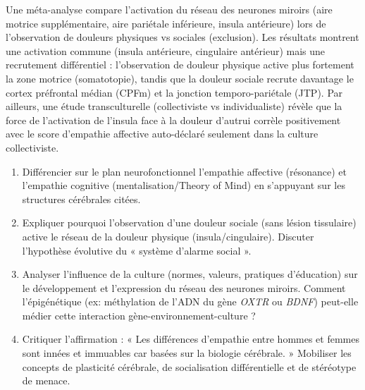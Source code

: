 \documentclass[11pt]{article}
\begin{document}
\begin{exercice}
Une méta-analyse compare l'activation du réseau des neurones miroirs (aire motrice supplémentaire, aire pariétale inférieure, insula antérieure) lors de l'observation de douleurs physiques vs sociales (exclusion). Les résultats montrent une activation commune (insula antérieure, cingulaire antérieur) mais une recrutement différentiel : l'observation de douleur physique active plus fortement la zone motrice (somatotopie), tandis que la douleur sociale recrute davantage le cortex préfrontal médian (CPFm) et la jonction temporo-pariétale (JTP). Par ailleurs, une étude transculturelle (collectiviste vs individualiste) révèle que la force de l'activation de l'insula face à la douleur d'autrui corrèle positivement avec le score d'empathie affective auto-déclaré seulement dans la culture collectiviste.
\begin{enumerate}
    \item Différencier sur le plan neurofonctionnel l'empathie affective (résonance) et l'empathie cognitive (mentalisation/Theory of Mind) en s'appuyant sur les structures cérébrales citées.
    \item Expliquer pourquoi l'observation d'une douleur sociale (sans lésion tissulaire) active le réseau de la douleur physique (insula/cingulaire). Discuter l'hypothèse évolutive du « système d'alarme social ».
    \item Analyser l'influence de la culture (normes, valeurs, pratiques d'éducation) sur le développement et l'expression du réseau des neurones miroirs. Comment l'épigénétique (ex: méthylation de l'ADN du gène \textit{OXTR} ou \textit{BDNF}) peut-elle médier cette interaction gène-environnement-culture ?
    \item Critiquer l'affirmation : « Les différences d'empathie entre hommes et femmes sont innées et immuables car basées sur la biologie cérébrale. » Mobiliser les concepts de plasticité cérébrale, de socialisation différentielle et de stéréotype de menace.
\end{enumerate}
\end{exercice}
\end{document}
